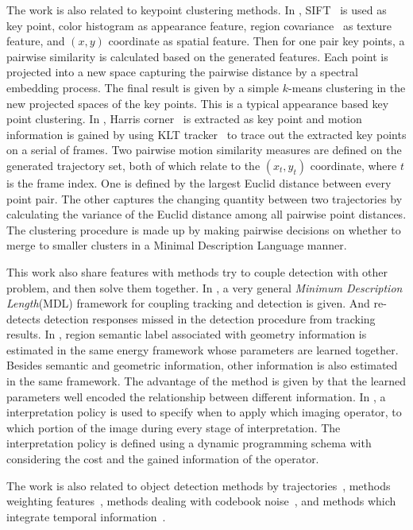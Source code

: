 The work is also related to keypoint clustering methods. In \cite{mc}, SIFT~\cite{o12} is
used as key point, color histogram as appearance feature, region covariance~\cite{ij6}
as texture feature, and $(x,y)$ coordinate as spatial feature. Then
for one pair key points, a pairwise similarity is calculated based
on the generated features. Each point is projected into a new space
capturing the pairwise distance by a spectral embedding process. The
final result is given by a simple $k$-means clustering in the new
projected spaces of the key points. This is a typical
appearance based key point clustering. In \cite{my9}, Harris
corner~\cite{ij2} is extracted as key point and motion information is
gained by using KLT tracker~\cite{ij3} to trace out the extracted key
points on a serial of frames. Two pairwise motion similarity
measures are defined on the generated trajectory set, both of which
relate to the $(x_t,y_t)$ coordinate, where $t$ is the frame index.
One is defined by the largest Euclid distance between every point
pair. The other captures the changing quantity between two
trajectories by calculating the variance of the Euclid distance
among all pairwise point distances. The clustering procedure is made
up by making pairwise decisions on whether to merge to smaller
clusters in a Minimal Description Language manner.

This work also share features with methods try to couple detection with other problem, and then solve them together.
In \cite{my7}, a very general \emph{Minimum Description Length}(MDL) framework for
coupling tracking and detection is given. And \cite{ij10} re-detects
detection responses missed in the detection procedure from tracking results. In
\cite{ij14}, region semantic label associated with geometry
information is estimated in the same energy framework whose
parameters are learned together. Besides semantic and geometric information,
other information is also estimated in the same framework. The
advantage of the method is given by that the learned parameters well
encoded the relationship between different information. In
\cite{ij15},  a interpretation policy is used to specify when to
apply which imaging operator, to which portion of the image during
every stage of interpretation. The interpretation policy is defined
using a dynamic programming schema with considering the cost and the
gained information of the operator.

The work is also related to object detection methods by trajectories~\cite{my9,ac24}, methods weighting features~\cite{ij13}, methods dealing with codebook noise~\cite{ac19}, and methods which integrate temporal information~\cite{ac23}.


